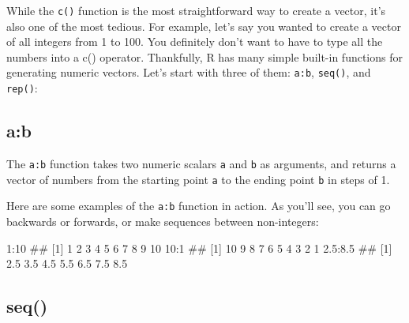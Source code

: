 \documentclass[]{book}
\newenvironment{Shaded}{\begin{snugshade}}{\end{snugshade}}
\newcommand{\DecValTok}[1]{\textcolor[rgb]{0.00,0.00,0.81}{{#1}}}
\newcommand{\FloatTok}[1]{\textcolor[rgb]{0.00,0.00,0.81}{{#1}}}
\newcommand{\NormalTok}[1]{{#1}}
\theoremstyle{definition}
\theoremstyle{definition}
\theoremstyle{remark}
\begin{document}
While the \texttt{c()} function is the most straightforward way to
create a vector, it's also one of the most tedious. For example, let's
say you wanted to create a vector of all integers from 1 to 100. You
definitely don't want to have to type all the numbers into a c()
operator. Thankfully, R has many simple built-in functions for
generating numeric vectors. Let's start with three of them:
\texttt{a:b}, \texttt{seq()}, and \texttt{rep()}:

\subsection{a:b}\label{ab}

The \texttt{a:b} function takes two numeric scalars \texttt{a} and
\texttt{b} as arguments, and returns a vector of numbers from the
starting point \texttt{a} to the ending point \texttt{b} in steps of 1.

Here are some examples of the \texttt{a:b} function in action. As you'll
see, you can go backwards or forwards, or make sequences between
non-integers:

\begin{Shaded}
\begin{Highlighting}[]
\DecValTok{1}\NormalTok{:}\DecValTok{10}
\NormalTok{##  [1]  1  2  3  4  5  6  7  8  9 10}
\DecValTok{10}\NormalTok{:}\DecValTok{1}
\NormalTok{##  [1] 10  9  8  7  6  5  4  3  2  1}
\FloatTok{2.5}\NormalTok{:}\FloatTok{8.5}
\NormalTok{## [1] 2.5 3.5 4.5 5.5 6.5 7.5 8.5}
\end{Highlighting}
\end{Shaded}

\subsection{seq()}\label{seq}
\end{document}

